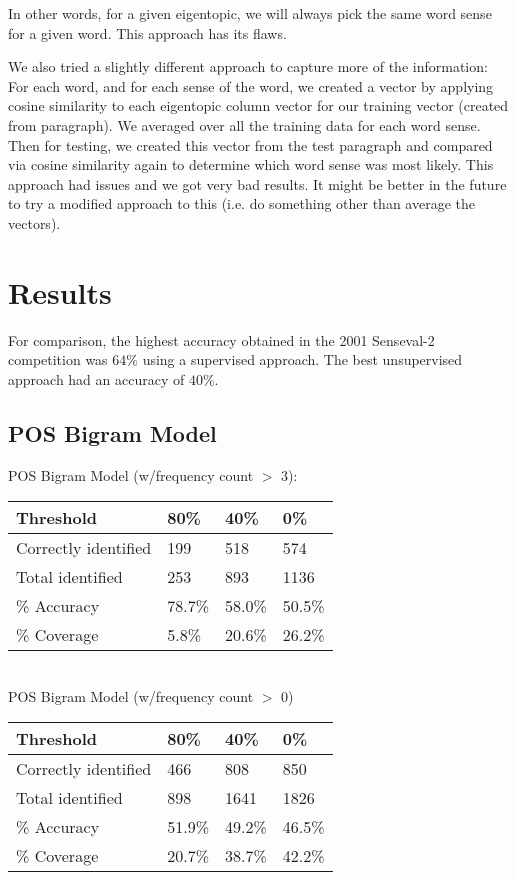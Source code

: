 \documentclass[10pt, letterpaper]{article}
\begin{document}
	In other words, for a given eigentopic, we will always pick the same word sense for a given word. This approach has its flaws.

	We also tried a slightly different approach to capture more of the information: For each word, and for each sense of the word, we created a vector by applying cosine similarity to each eigentopic column vector for our training vector (created from paragraph). We averaged over all the training data for each word sense. Then for testing, we created this vector from the test paragraph and compared via cosine similarity again to determine which word sense was most likely. 
	This approach had issues and we got very bad results. 
	It might be better in the future to try a modified approach to this (i.e. do something other than average the vectors).
	\section{Results}
	For comparison, the highest accuracy obtained in the 2001 Senseval-2 competition was $64\%$ using a supervised approach. The best unsupervised approach had an accuracy of $40\%$.

	\subsection{POS Bigram Model}

	POS Bigram Model (w/frequency count $>$ 3): 
	\begin{table}[h]
	\begin{tabular}{|l|l|l|l|}
	\hline
	Threshold            & 80\%   & 40\%   & 0\%    \\ \hline
	Correctly identified & 199    & 518    & 574    \\ \hline
	Total identified     & 253    & 893    & 1136   \\ \hline
	\% Accuracy          & 78.7\% & 58.0\% & 50.5\% \\ \hline
	\% Coverage			 & 5.8\%  & 20.6\% & 26.2\% \\ \hline
	\end{tabular}
	\end{table}\\
	POS Bigram Model (w/frequency count $>$ 0)
	\begin{table}[h]
	\begin{tabular}{|l|l|l|l|}
	\hline
	Threshold            & 80\%   & 40\%   & 0\%    \\ \hline
	Correctly identified & 466    & 808    & 850    \\ \hline
	Total identified     & 898    & 1641   & 1826   \\ \hline
	\% Accuracy          & 51.9\% & 49.2\% & 46.5\% \\ \hline
	\% Coverage          & 20.7\% & 38.7\% & 42.2\% \\ \hline
	\end{tabular}
	\end{table}
\end{document}
